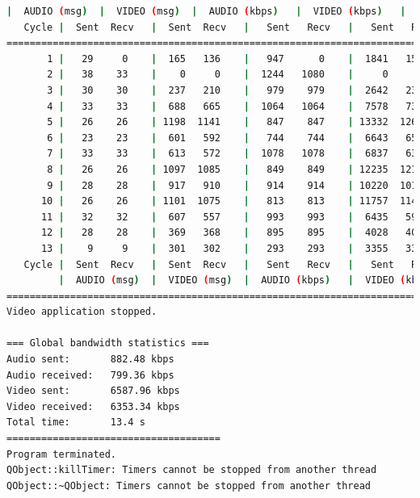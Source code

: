 \begin{lstlisting}[language=bash,basicstyle=\ttfamily\tiny]
         |  AUDIO (msg)  |  VIDEO (msg)  |  AUDIO (kbps)   |  VIDEO (kbps)   |     CPU (%) 
   Cycle |  Sent  Recv   |  Sent  Recv   |   Sent   Recv   |   Sent   Recv   | Program System
================================================================================================
       1 |   29     0    |  165   136    |   947      0    |  1841   1519    |  26      0       
       2 |   38    33    |    0     0    |  1244   1080    |     0      0    |  44     79       
       3 |   30    30    |  237   210    |   979    979    |  2642   2339    |  39     73       
       4 |   33    33    |  688   665    |  1064   1064    |  7578   7325    |  36     77       
       5 |   26    26    | 1198  1141    |   847    847    | 13332  12699    |  36     74       
       6 |   23    23    |  601   592    |   744    744    |  6643   6541    |  22     77       
       7 |   33    33    |  613   572    |  1078   1078    |  6837   6379    |  41     75       
       8 |   26    26    | 1097  1085    |   849    849    | 12235  12101    |  27     77       
       9 |   28    28    |  917   910    |   914    914    | 10220  10142    |  24     73       
      10 |   26    26    | 1101  1075    |   813    813    | 11757  11479    |  30     73       
      11 |   32    32    |  607   557    |   993    993    |  6435   5903    |  27     77       
      12 |   28    28    |  369   368    |   895    895    |  4028   4020    |  32     78       
      13 |    9     9    |  301   302    |   293    293    |  3355   3368    |  15     68       
   Cycle |  Sent  Recv   |  Sent  Recv   |   Sent   Recv   |   Sent   Recv   | Program System
         |  AUDIO (msg)  |  VIDEO (msg)  |  AUDIO (kbps)   |  VIDEO (kbps)   |     CPU (%) 
===========================================================================================
Video application stopped.

=== Global bandwidth statistics ===
Audio sent:       882.48 kbps
Audio received:   799.36 kbps
Video sent:       6587.96 kbps
Video received:   6353.34 kbps
Total time:       13.4 s
=====================================
Program terminated.
QObject::killTimer: Timers cannot be stopped from another thread
QObject::~QObject: Timers cannot be stopped from another thread
\end{lstlisting}
\vspace{\baselineskip}

